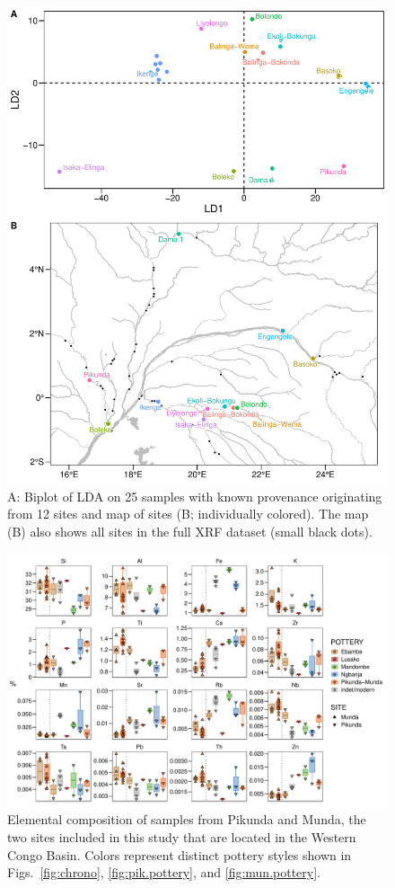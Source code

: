 \documentclass[a4paper]{article}
\begin{document}
\begin{figure}[H]
	\includegraphics[width=\textwidth]{Fig_XRF_prov_LCA.pdf}
	\caption{A: Biplot of LDA on 25 samples with known provenance originating from 12 sites and map of sites (B; individually colored). The map (B) also shows all sites in the full XRF dataset (small black dots).}
	\label{fig:xrf.lda}
\end{figure}

\begin{figure}[H]
	\includegraphics[width=\textwidth]{Fig_XRF_pik-mun.pdf}
	\caption{Elemental composition of samples from Pikunda and Munda, the two sites included in this study that are located in the Western Congo Basin. Colors represent distinct pottery styles shown in Figs.~\ref{fig:chrono}, \ref{fig:pik.pottery}, and \ref{fig:mun.pottery}.}
	\label{fig:xrf.pik-mun.comp}
\end{figure}
\end{document}
